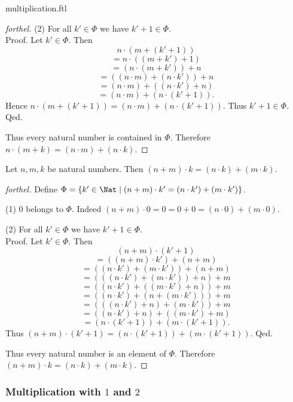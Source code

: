 \documentclass{naproche-library}
\begin{document}
\begin{smodule}{multiplication.ftl}
\begin{proof}[forthel]
    (2) For all $k' \in \Phi$ we have $k' + 1 \in \Phi$. \\
    Proof.
      Let $k'\in \Phi$.
      Then
      \[  n \cdot (m + (k' + 1))                  \]
      \[    = n \cdot ((m + k') + 1)              \]
      \[    = (n \cdot (m + k')) + n              \]
      \[    = ((n \cdot m) + (n \cdot k')) + n    \]
      \[    = (n \cdot m) + ((n \cdot k') + n)    \]
      \[    = (n \cdot m) + (n \cdot (k' + 1)).   \]
      Hence $n \cdot (m + (k' + 1)) = (n \cdot m) + (n \cdot (k' + 1))$.
      Thus $k' + 1 \in \Phi$.
    Qed.

    Thus every natural number is contained in $\Phi$.
    Therefore $n \cdot (m + k) = (n \cdot m) + (n \cdot k)$.
  \end{proof}

  \begin{proposition}[forthel,id=ARITHMETIC_06_5742967566368768]
    Let $n, m, k$ be natural numbers.
    Then $(n + m) \cdot k = (n \cdot k) + (m \cdot k)$.
  \end{proposition}
  \begin{proof}[forthel]
    Define $\Phi = \{ k' \in \Nat \mid (n + m) \cdot k' = (n \cdot k') + (m \cdot k') \}$.

    (1) $0$ belongs to $\Phi$.
    Indeed $(n + m) \cdot 0
      = 0
      = 0 + 0
      = (n \cdot 0) + (m \cdot 0)$.

    (2) For all $k' \in \Phi$ we have $k' + 1 \in \Phi$. \\
    Proof.
      Let $k' \in \Phi$.
      Then
      \[  (n + m) \cdot (k' + 1)                        \]
      \[    = ((n + m) \cdot k') + (n + m)              \]
      \[    = ((n \cdot k') + (m \cdot k')) + (n + m)   \]
      \[    = (((n \cdot k') + (m \cdot k')) + n) + m   \]
      \[    = ((n \cdot k') + ((m \cdot k') + n)) + m   \]
      \[    = ((n \cdot k') + (n + (m \cdot k'))) + m   \]
      \[    = (((n \cdot k') + n) + (m \cdot k')) + m   \]
      \[    = ((n \cdot k') + n) + ((m \cdot k') + m)   \]
      \[    = (n \cdot (k' + 1)) + (m \cdot (k' + 1)).  \]
      Thus $(n + m) \cdot (k' + 1) = (n \cdot (k' + 1)) + (m \cdot (k' + 1))$.
    Qed.

    Thus every natural number is an element of $\Phi$.
    Therefore $(n + m) \cdot k = (n \cdot k) + (m \cdot k)$.
  \end{proof}


  \subsubsection*{Multiplication with $1$ and $2$}


\end{smodule}
\end{document}
